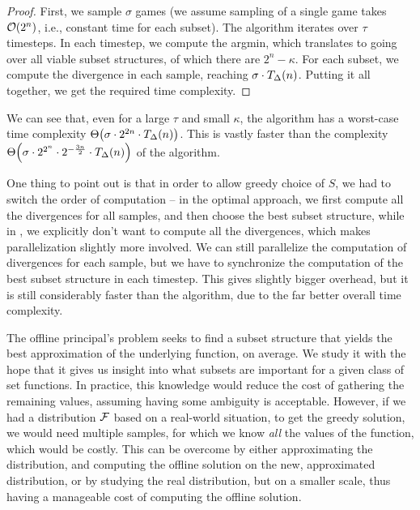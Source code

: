 \begin{proof}
  First, we sample $ \sigma $ games (we assume sampling of a single game takes $ \mathcal{O}\!\left(2^n\right) $, i.e., constant time for each subset).
  The algorithm iterates over $ \tau $ timesteps. 
  In each timestep, we compute the argmin, which translates to going over all viable subset structures, of which there are $ 2^n-\kappa $.
  For each subset, we compute the divergence in each sample, reaching $ \sigma \cdot T_\Delta\!\left(n\right) $.
  Putting it all together, we get the required time complexity.
\end{proof}

We can see that, even for a large $ \tau $ and small $ \kappa $, the \algFG{} algorithm has a worst-case time complexity $ \Theta\!\left(\sigma \cdot 2^{2n} \cdot T_\Delta\!\left(n\right)\right) $.
This is vastly faster than the complexity $ \Theta\!\left(\sigma \cdot 2^{2^n} \cdot 2^{-\frac{3n}{2}}\cdot T_\Delta\!\left(n\right)\right) $ of the \algFO{} algorithm.

One thing to point out is that in order to allow greedy choice of $ S $, we had to switch the order of computation -- in the optimal approach, we first compute all the divergences for all samples, and then choose the best subset structure, while in \algFG{}, we explicitly don't want to compute all the divergences, which makes parallelization slightly more involved.
We can still parallelize the computation of divergences for each sample, but we have to synchronize the computation of the best subset structure in each timestep.
This gives slightly bigger overhead, but it is still considerably faster than the \algFO{} algorithm, due to the far better overall time complexity.

The offline principal's problem seeks to find a subset structure that yields the best approximation of the underlying function, on average.
We study it with the hope that it gives us insight into what subsets are important for a given class of set functions.
In practice, this knowledge would reduce the cost of gathering the remaining values, assuming having some ambiguity is acceptable.
However, if we had a distribution $ \mathcal{F} $ based on a real-world situation, to get the greedy solution, we would need multiple samples, for which we know \emph{all} the values of the function, which would be costly.
This can be overcome by either approximating the distribution, and computing the offline solution on the new, approximated distribution, or by studying the real distribution, but on a smaller scale, thus having a manageable cost of computing the offline solution.

